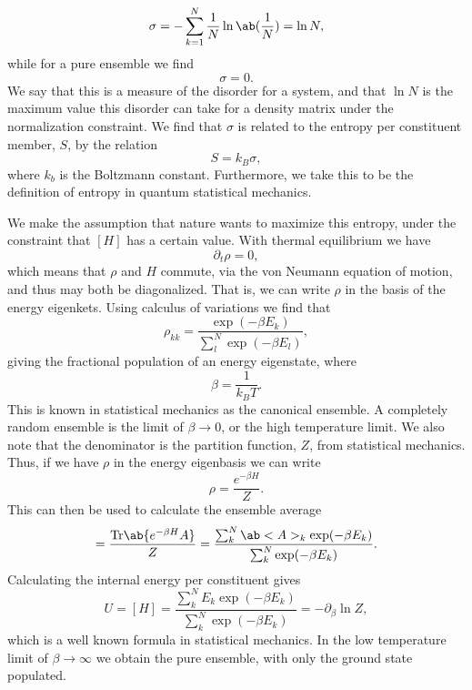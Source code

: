 \begin{equation}
    \sigma = - \sum_{k=1}^N \frac{1}{N} \ln\ab(\frac{1}{N}) = \ln N,
\end{equation}
while for a pure ensemble we find
\begin{equation}
    \sigma = 0.
\end{equation}
We say that this is a measure of the disorder for a system, and that $\ln N$ is the maximum value this disorder can take for a density matrix under the normalization constraint. We find that $\sigma$ is related to the entropy per constituent member, $S$, by the relation
\begin{equation}
    S = k_B \sigma,
\end{equation}
where $k_b$ is the Boltzmann constant. Furthermore, we take this to be the definition of entropy in quantum statistical mechanics.

We make the assumption that nature wants to maximize this entropy, under the constraint that $[H]$ has a certain value. With thermal equilibrium we have
\begin{equation}
    \partial_t \rho = 0,
\end{equation}
which means that $\rho$ and $H$ commute, via the von Neumann equation of motion, and thus may both be diagonalized. That is, we can write $\rho$ in the basis of the energy eigenkets. Using calculus of variations we find that 
\begin{equation}
    \rho_{kk} = \frac{\exp(-\beta E_k)}{\sum_l^N \exp(-\beta E_l)},
\end{equation}
giving the fractional population of an energy eigenstate, where
\begin{equation}
    \beta = \frac{1}{k_B T}.
\end{equation}
This is known in statistical mechanics as the canonical ensemble. A completely random ensemble is the limit of $\beta \to 0$, or the high temperature limit. We also note that the denominator is the partition function, $Z$, from statistical mechanics. Thus, if we have $\rho$ in the energy eigenbasis we can write 
\begin{equation}
    \rho = \frac{e^{-\beta H}}{Z}.
\end{equation}
This can then be used to calculate the ensemble average 
\begin{equation}
    [A] = \frac{\trace{e^{-\beta H} A}}{Z} = \frac{\sum_k^N \expval{A}_k \exp(-\beta E_k)}{\sum_k^N \exp(-\beta E_k)}.
\end{equation}
Calculating the internal energy per constituent gives
\begin{equation}
    U = [H] = \frac{\sum_k^N E_k \exp(-\beta E_k)}{\sum_k^N \exp(-\beta E_k)} = - \partial_\beta \ln Z,
\end{equation}
which is a well known formula in statistical mechanics. In the low temperature limit of $\beta \to \infty$ we obtain the pure ensemble, with only the ground state populated.

